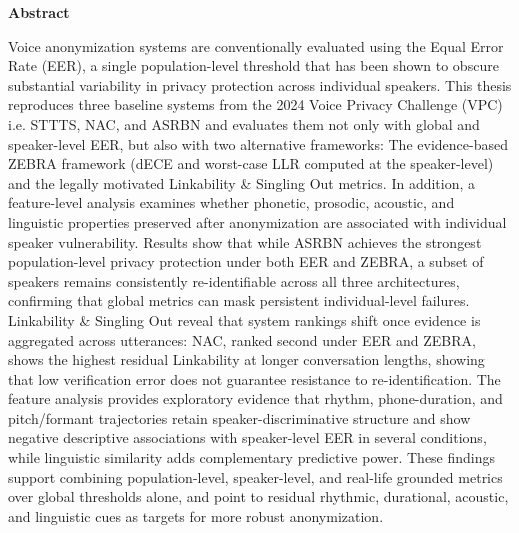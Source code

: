 \documentclass[12pt,leqno,a4paper]{article}
\begin{document}
\begin{center}
\textbf{Abstract}\\[1em] %
\begin{minipage}{0.85\textwidth}
\noindent
Voice anonymization systems are conventionally evaluated using the Equal Error Rate (EER), a single population-level threshold that has been shown to obscure substantial variability in privacy protection across individual speakers. 
This thesis reproduces three baseline systems from the 2024 Voice Privacy Challenge (VPC) i.e. STTTS, NAC, and ASRBN and evaluates them not only with global and speaker-level EER, but also with two alternative frameworks: The evidence-based ZEBRA framework (dECE and worst-case LLR computed at the speaker-level) and the legally motivated Linkability \& Singling Out metrics. 
In addition, a feature-level analysis examines whether phonetic, prosodic, acoustic, and linguistic properties preserved after anonymization are associated with individual speaker vulnerability. Results show that while ASRBN achieves the strongest population-level privacy protection under both EER and ZEBRA, a subset of speakers remains consistently re-identifiable across all three architectures, confirming that global metrics can mask persistent individual-level failures.
Linkability \& Singling Out reveal that system rankings shift once evidence is aggregated across utterances: NAC, ranked second under EER and ZEBRA, shows the highest residual Linkability at longer conversation lengths, showing that low verification error does not guarantee resistance to re-identification. The feature analysis provides exploratory evidence that rhythm, phone-duration, and pitch/formant trajectories retain speaker-discriminative structure and show negative descriptive
associations with speaker-level EER in several conditions, while linguistic similarity adds complementary predictive power. These findings support combining population-level, speaker-level, and real-life grounded metrics over global thresholds alone, and point to residual rhythmic, durational, acoustic, and linguistic cues as targets for more robust anonymization.
\end{minipage}
\end{center}


\newpage
\tableofcontents
\cleardoublepage

\listoftables
{}
\cleardoublepage

\listoffigures
{}
\cleardoublepage
\end{document}
